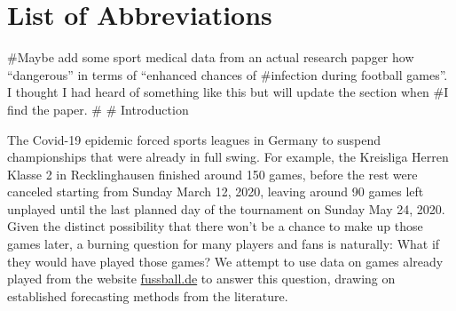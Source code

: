 \documentclass[12pt,a4paper]{article}
\begin{document}
\newpage
\listoffigures
{}

\listoftables
{}

\section*{List of Abbreviations}

\begin{adjustwidth}{1.5em}{0pt}

\begin{acronym}[dummyyyy]


\end{acronym}

\end{adjustwidth}

\restoregeometry

\newpage
{}
\#Maybe add some sport medical data from an actual research papger how
\enquote{dangerous} in terms of \enquote{enhanced chances of \#infection
during football games}. I thought I had heard of something like this but
will update the section when \#I find the paper. \# \# Introduction

The Covid-19 epidemic forced sports leagues in Germany to suspend
championships that were already in full swing. For example, the
Kreisliga Herren Klasse 2 in Recklinghausen finished around 150 games,
before the rest were canceled starting from Sunday March 12, 2020,
leaving around 90 games left unplayed until the last planned day of the
tournament on Sunday May 24, 2020. Given the distinct possibility that
there won't be a chance to make up those games later, a burning question
for many players and fans is naturally: What if they would have played
those games? We attempt to use data on games already played from the
website
\href{http://www.fussball.de/spielplan/re-kl-a-2-kreis-recklinghausen-kreisliga-a-herren-saison1920-westfalen/-/staffel/027II28DS800000DVS5489B3VS3GHJJU-G\#!/section/matchplan}{fussball.de}
to answer this question, drawing on established forecasting methods from
the literature.
\end{document}
